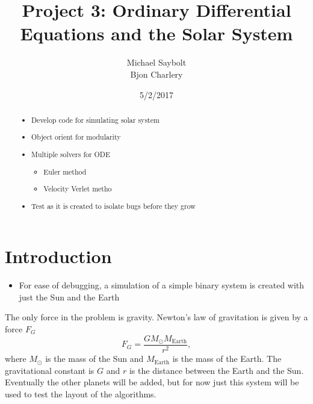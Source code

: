 \documentclass[12pt]{article}
\begin{document}
	\title{Project 3: Ordinary Differential Equations and the Solar System}
	\author{Michael Saybolt \\ Bjon Charlery}
	
	\date{5/2/2017}
	\maketitle
	\pagebreak

\begin{abstract}
%
\begin{itemize}
	\item Develop code for simulating solar system
	\item Object orient for modularity
	\item Multiple solvers for ODE
		\begin{itemize}
		\item Euler method
		\item Velocity Verlet metho
		\end{itemize}
	\item Test as it is created to isolate bugs before they grow
\end{itemize}
\end{abstract}

\bigskip
\bigskip

\section{Introduction}
%
\begin{itemize}
	\item For ease of debugging, a simulation of a simple binary system is created with just the Sun and the Earth
\end{itemize}
The only force in the problem is gravity. Newton's law of gravitation  is given by a force $F_G$
\[
F_G=\frac{GM_{\odot}M_{\mathrm{Earth}}}{r^2},
\]
where $M_{\odot}$ is the mass of the Sun and $M_{\mathrm{Earth}}$ is the mass of the Earth. The gravitational constant is $G$ and $r$ is the distance between the Earth and the Sun. Eventually the other planets will be added, but for now just this system will be used to test the layout of the algorithms.
\end{document}
